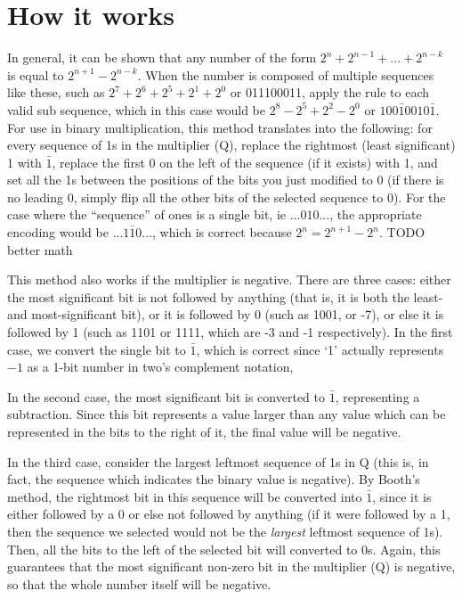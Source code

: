 \documentclass{article}
\begin{document}


\section{How it works}


    In general, it can be shown that any number of the form $2^n + 2^{n-1} + ...
+ 2^{n-k}$ is equal to $2^{n+1} - 2^{n-k}$.
When the number is composed of multiple sequences like these, such as $2^7 + 2^6 + 2^5 + 2^1 + 2^0$ or 011100011, apply the rule to each valid sub sequence, which in this case would be $2^8 - 2^5 + 2^2 - 2^0$ or $100\bar{1}0010\bar{1}$.
For use in binary multiplication, this method translates into the following: for every sequence of 1s in the multiplier (Q), replace the rightmost (least significant) 1 with $\bar{1}$, replace the first 0 on the left of the sequence (if it exists) with 1, and set all the 1s between the positions of the bits you just modified to 0 (if there is no leading 0, simply flip all the other bits of the selected sequence to 0).
For the case where the ``sequence'' of ones is a single bit, ie $...010...$,
the appropriate encoding would be $...1\bar{1}0...$,
which is correct because $2^n = 2^{n+1} - 2^n$.
TODO better math

This method also works if the multiplier is negative.
There are three cases: either the most significant bit is not followed by anything (that is, it is both the least- and most-significant bit), or it is followed by 0 (such as 1001, or -7), or else it is followed by 1 (such as 1101 or 1111, which are -3 and -1 respectively).
In the first case, we convert the single bit to $\bar{1}$, which is correct since `1' actually represents $-1$ as a 1-bit number in two's complement notation, 

In the second case, the most significant bit is converted to $\bar{1}$, representing a subtraction.
Since this bit represents a value larger than any value which can be represented in the bits to the right of it, the final value will be negative.

In the third case, consider the largest leftmost sequence of 1s in Q (this is, in fact, the sequence which indicates the binary value is negative).
By Booth's method, the rightmost bit in this sequence will be converted into $\bar{1}$, since it is either followed by a 0 or else not followed by anything (if it were followed by a 1, then the sequence we selected would not be the \emph{largest} leftmost sequence of 1s).
Then, all the bits to the left of the selected bit will converted to 0s.
Again, this guarantees that the most significant non-zero bit in the multiplier (Q) is negative, so that the whole number itself will be negative.
\end{document}
